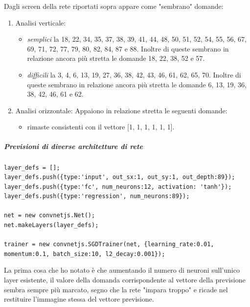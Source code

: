 Dagli screen della rete riportati sopra appare come "sembrano" domande:
\begin{enumerate}
\item Analisi verticale:
\begin{itemize}
\item \textit{semplici} la 18, 22, 34, 35, 37, 38, 39, 41, 44, 48, 50, 51, 52, 54, 55, 56, 67, 69,  71, 72, 77, 79, 80, 82, 84, 87 e 88. Inoltre di queste sembrano in relazione ancora pi\`u stretta le domande 18, 22, 38, 52 e 57.
\item \textit{difficili} la 3, 4, 6, 13, 19, 27, 36, 38, 42, 43, 46, 61, 62, 65, 70. Inoltre di queste sembrano in relazione ancora pi\`u stretta le domande 6, 13, 19, 36, 38, 42, 46, 61 e 62.
\end{itemize}
\item Analisi orizzontale:
Appaiono in relazione stretta le seguenti domande:
\begin{itemize}
\item rimaste consistenti con il vettore [1, 1, 1, 1, 1, 1].
\end{itemize}
\end{enumerate}


\subparagraph{Previsioni di diverse architetture di rete}
\label{Previsioni di diverse architetture di rete}
\begin{verbatim}
layer_defs = [];
layer_defs.push({type:'input', out_sx:1, out_sy:1, out_depth:89});
layer_defs.push({type:'fc', num_neurons:12, activation: 'tanh'});
layer_defs.push({type:'regression', num_neurons:89});

net = new convnetjs.Net();
net.makeLayers(layer_defs);

trainer = new convnetjs.SGDTrainer(net, {learning_rate:0.01, momentum:0.1, batch_size:10, l2_decay:0.001});
\end{verbatim}
La prima cosa che ho notato \`e che aumentando il numero di neuroni sull'unico layer esistente, il valore della domanda corrispondente al vettore della previsione sembra sempre pi\`u marcato, segno che la rete "impara troppo" e ricade nel restituire l'immagine stessa del vettore previsione.

